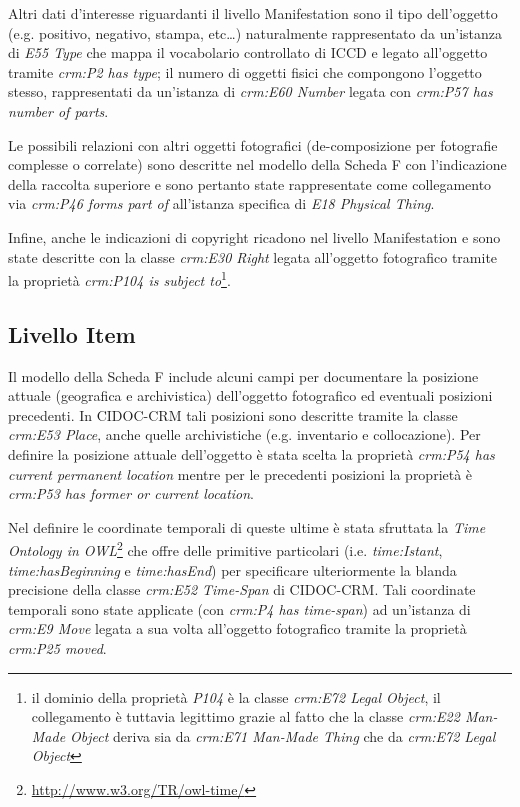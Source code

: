 Altri dati d'interesse riguardanti il livello Manifestation sono il tipo dell'oggetto (e.g. positivo, negativo, stampa, etc\dots) naturalmente rappresentato da un'istanza di \emph{E55 Type} che mappa il vocabolario controllato di ICCD e legato all'oggetto tramite \emph{crm:P2 has type}; il numero di oggetti fisici che compongono l'oggetto stesso, rappresentati da un'istanza di \emph{crm:E60 Number} legata con \emph{crm:P57 has number of parts}.

Le possibili relazioni con altri oggetti fotografici (de-composizione per fotografie complesse o correlate) sono descritte nel modello della Scheda F con l'indicazione della raccolta superiore e sono pertanto state rappresentate come collegamento via \emph{crm:P46 forms part of} all'istanza specifica di \emph{E18 Physical Thing}.

Infine, anche le indicazioni di copyright ricadono nel livello Manifestation e sono state descritte con la classe \emph{crm:E30 Right} legata all'oggetto fotografico tramite la proprietà \emph{crm:P104 is subject to}\footnote{il dominio della proprietà \emph{P104} è la classe \emph{crm:E72 Legal Object}, il collegamento è tuttavia legittimo grazie al fatto che la classe \emph{crm:E22 Man-Made Object} deriva sia da \emph{crm:E71 Man-Made Thing} che da \emph{crm:E72 Legal Object}}.

\subsection{Livello Item}

Il modello della Scheda F include alcuni campi per documentare la posizione attuale (geografica e archivistica) dell'oggetto fotografico ed eventuali posizioni precedenti. In CIDOC-CRM tali posizioni sono descritte tramite la classe \emph{crm:E53 Place}, anche quelle archivistiche (e.g. inventario e collocazione). Per definire la posizione attuale dell'oggetto è stata scelta la proprietà \emph{crm:P54 has current permanent location} mentre per le precedenti posizioni la proprietà è \emph{crm:P53 has former or current location}.

Nel definire le coordinate temporali di queste ultime è stata sfruttata la \emph{Time Ontology in OWL}\footnote{\url{http://www.w3.org/TR/owl-time/}} che offre delle primitive particolari (i.e. \emph{time:Istant}, \emph{time:hasBeginning} e \emph{time:hasEnd}) per specificare ulteriormente la blanda precisione della classe \emph{crm:E52 Time-Span} di CIDOC-CRM. Tali coordinate temporali sono state applicate (con \emph{crm:P4 has time-span}) ad un'istanza di \emph{crm:E9 Move} legata a sua volta all'oggetto fotografico tramite la proprietà \emph{crm:P25 moved}.

